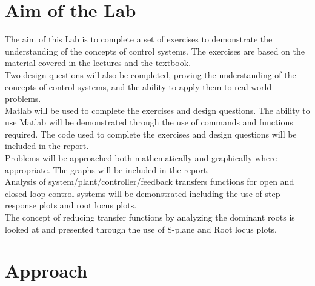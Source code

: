 \documentclass[12pt]{article}
\begin{document}



\pagebreak

\tableofcontents


\pagebreak

\section{Aim of the Lab}\label{sec:aim}

The aim of this Lab is to complete a set of exercises to demonstrate the understanding of the concepts of control systems. The exercises are based on the material covered in the lectures and the textbook. \\

Two design questions will also be completed, proving the understanding of the concepts of control systems, and the ability to apply them to real world problems.\\

Matlab will be used to complete the exercises and design questions. The ability to use Matlab will be demonstrated through the use of commands and functions required.
The code used to complete the exercises and design questions will be included in the report.\\

Problems will be approached both mathematically and graphically where appropriate. The graphs will be included in the report. \\

Analysis of system/plant/controller/feedback transfers functions for open and closed loop control systems will be demonstrated including the use of step response plots and root locus plots.\\

The concept of reducing transfer functions by analyzing the dominant roots is looked at and presented through the use of S-plane and Root locus plots.\\


\section{Approach}\label{sec:approach}
\end{document}
